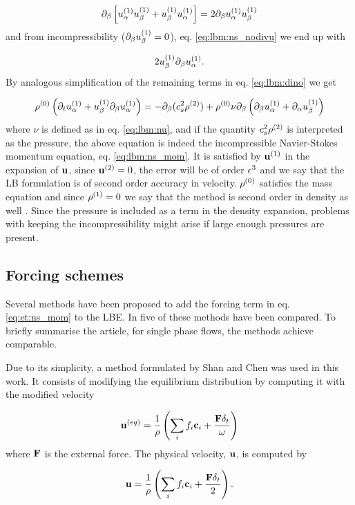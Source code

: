 \begin{equation}
\partial_{\beta} \left[ u_{\alpha}^{(1)}u_{\beta}^{(1)} + u_{\beta}^{(1)}u_{\alpha}^{(1)}
  \right] = 2\partial_{\beta}u_{\alpha}^{(1)}u_{\beta}^{(1)} 
\end{equation}
and from incompressibility ($\partial_{\beta}u_{\beta}^{(1)} = 0$),
eq. \eqref{eq:lbm:ns_nodivu} we end up with

\begin{equation}
2u_{\beta}^{(1)}\partial_{\beta}u_{\alpha}^{(1)}.
\end{equation}
By analogous simplification of the remaining terms in
eq. \eqref{eq:lbm:dino} we get

\begin{equation}\label{eq:lbm:ns_mom_index}
\rho^{(0)} \left( \partial_t u_{\alpha}^{(1)} +
u_{\beta}^{(1)}\partial_{\beta}u_{\alpha}^{(1)} \right) = -\partial_{\beta}(c_s^2
\rho^{(2)}) + \rho^{(0)}\nu \partial_{\beta} \left( \partial_{\beta}u_{\alpha}^{(1)} +
\partial_{\alpha}u_{\beta}^{(1)} \right)
\end{equation}
where $\nu$ is defined as in eq. \eqref{eq:lbm:nu}, and if the
quantity $c_s^2\rho^{(2)}$ is interpreted as the pressure, the above
equation is indeed the incompressible Navier-Stokes momentum equation,
eq. \eqref{eq:lbm:ns_mom}. It is satisfied by $\mathbf{u}^{(1)}$ in the
expansion of $\mathbf{u}$, since $\mathbf{u}^{(2)} = 0$, the error will be of order
$\epsilon^3$ and we say that the LB formulation is of second order accuracy
in velocity. $\rho^{(0)}$ satisfies the mass equation and since
$\rho^{(1)} = 0$ we say that the method is second order in density as
well \cite{junk-asym}. Since the pressure is included as a term in the
density expansion, problems with keeping the incompressibility might
arise if large enough pressures are present.

\subsection{Forcing schemes}\label{sec:lbm:forces}
Several methods have been proposed to add the forcing term in
eq. \eqref{eq:et:ns_mom} to the LBE. In \cite{krafczyk} five of these
methods have been compared. To briefly summarise the article, for
single phase flows, the methods achieve comparable. 

Due to its simplicity, a method formulated by Shan and Chen
\cite{shan-chen} was used in this work. It consists of modifying the
equilibrium distribution by computing it with the modified velocity

\begin{equation}
\mathbf{u}^{(eq)} = \frac{1}{\rho}\left(\sum_i f_i \mathbf{c}_i +
\frac{\mathbf{F}\delta_t}{\omega} \right)
\end{equation}
where $\mathbf{F}$ is the external force. The physical velocity, $\mathbf{u}$, is
computed by

\begin{equation}
\mathbf{u} = \frac{1}{\rho}\left(\sum_i f_i \mathbf{c}_i +
\frac{\mathbf{F}\delta_t}{2} \right).
\end{equation} 
